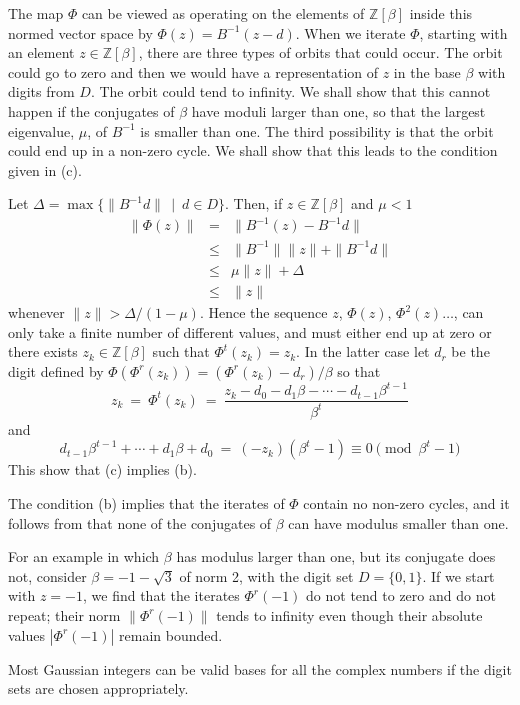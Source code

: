 \documentclass[12pt]{article}
\newcommand{\Z}{\mathbb{Z}}
\begin{document}
    The map $\Phi$ can be viewed as operating on the elements of $\Z[\beta]$ inside
this normed vector space by $\Phi(z)=B^{-1}(z-d)$. When we iterate $\Phi$, starting
with an element $z\in\Z[\beta]$, there are three types of orbits that could occur.
The orbit could go to zero and then we would have a representation of $z$ in
the base $\beta$ with digits from $D$. 
The orbit could tend to infinity. We shall
show that this cannot happen if the conjugates of $\beta$ have moduli larger than
one, so that the largest eigenvalue, $\mu$, of $B^{-1}$ is smaller than one. The third
possibility is that the orbit could end up in a non-zero cycle. We shall show
that this leads to the condition given in (c).

  Let $\Delta=\max\{\|B^{-1}d\| \,\mid\ d\in D\}$. Then, if $z\in\Z[\beta]$ and $\mu < 1$
\begin{eqnarray*}
\|\Phi(z)\|&=&\|B^{-1}(z)-B^{-1}d\|\\
&\leqslant&\|B^{-1}\| \|z\|+\|B^{-1}d\|\\
&\leqslant&\mu \|z\|+ \Delta\\
&\leqslant&\|z\|
\end{eqnarray*}
whenever $\|z\|>\Delta/(1-\mu)$. 
Hence the sequence $z$, $\Phi(z)$, $\Phi^2(z)\ldots$, can
only take a finite number of different values, and must either end up at
zero or there exists $z_k\in\Z[\beta]$ such that $\Phi^t(z_k)=z_k$. 
In the latter case let $d_r$ be the digit defined by
$\Phi(\Phi^r(z_k))= (\Phi^r(z_k)-d_r)/\beta$ so that
$$
z_k \ = \ \Phi^t(z_k) \ = \ \frac{z_k-d_0-d_1\beta-\cdots-d_{t-1}\beta^{t-1}}{\beta^t}
$$
and
$$
d_{t-1}\beta^{t-1}+\cdots+d_1\beta+d_0\ = \ (-z_k)(\beta^t-1)\equiv 0 \pmod{\beta^t-1}
$$
This show that (c) implies (b).

    The condition (b) implies that the iterates of $\Phi$ contain no non-zero
cycles, and it follows from \cite[cor. 4]{radix} that none of the conjugates of $\beta$ can have modulus smaller than one. 
\hspace*{\fill}\fbox{\phantom{:}}\medskip

    For an example in which $\beta$ has modulus larger than one, but its conjugate does not, consider $\beta=-1-\sqrt3$ of norm 2, with the digit set 
$D = \{0, 1\}$. 
If we start with $z = -1$, we find that the iterates $\Phi^r(-1)$ do not tend to zero and do not repeat; their norm $\|\Phi^r(-1)\|$ tends to infinity even though their absolute values $|\Phi^r(-1)|$ remain bounded.

    Most Gaussian integers can be valid bases for all the complex numbers
if the digit sets are chosen appropriately.
\end{document}
